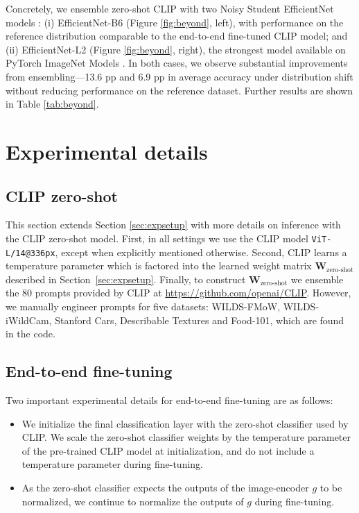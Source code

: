 Concretely, we ensemble zero-shot CLIP with two Noisy Student EfficientNet models \cite{xie2020self,tan2019efficientnet}: (i) EfficientNet-B6 (Figure \ref{fig:beyond}, left), with performance on the reference distribution comparable to the end-to-end fine-tuned CLIP model;
 and (ii) EfficientNet-L2 (Figure \ref{fig:beyond}, right), the strongest model available on PyTorch ImageNet Models \cite{rw2019timm}.
 In both cases, we observe substantial improvements from ensembling---13.6 pp and 6.9 pp in average accuracy under distribution shift without reducing performance on the reference dataset. Further results are shown in Table \ref{tab:beyond}.


\section{Experimental details}
\label{sec:appendix_hparam}

\subsection{CLIP zero-shot}\label{sec:morezs}

This section extends Section \ref{sec:expsetup} with more details on inference with the CLIP zero-shot model. First, in all settings we use the CLIP model \texttt{ViT-L/14@336px}, except when explicitly mentioned otherwise.
Second, CLIP learns a temperature parameter which is factored into the learned weight matrix $\textbf{W}_{\text{zero-shot}}$ described in Section~\ref{sec:expsetup}. Finally, to construct $\textbf{W}_{\text{zero-shot}}$ we ensemble the 80 prompts provided by CLIP at \url{https://github.com/openai/CLIP}. However, we manually engineer prompts for five datasets: WILDS-FMoW, WILDS-iWildCam, Stanford Cars, Describable Textures and Food-101, which are found in the code.

\subsection{End-to-end fine-tuning}
\label{sec:e2e-ft}

Two important experimental details for end-to-end fine-tuning are as follows:
\begin{itemize}
    \item We initialize the final classification layer with the zero-shot classifier used by CLIP. We scale the zero-shot classifier weights by the temperature parameter of the pre-trained CLIP model at initialization, and do not include a temperature parameter during fine-tuning.
    \item As the zero-shot classifier expects the outputs of the image-encoder $g$ to be normalized, we continue to normalize the outputs of $g$ during fine-tuning.
\end{itemize}

